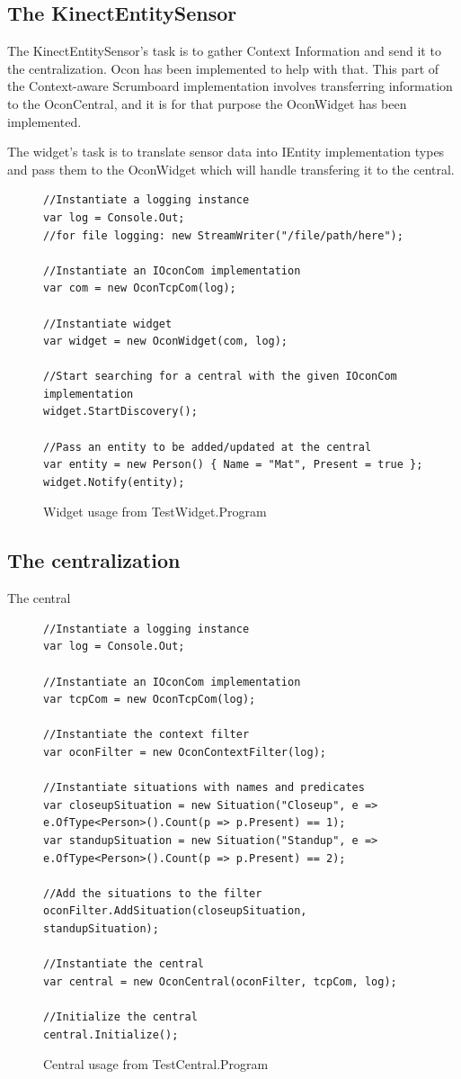 \documentclass[]{report}
\begin{document}
\subsection{The KinectEntitySensor}
The KinectEntitySensor's task is to gather Context Information and send it to the centralization. Ocon has been implemented to help with that. This part of the Context-aware Scrumboard implementation involves transferring information to the OconCentral, and it is for that purpose the OconWidget has been implemented.

The widget's task is to translate sensor data into IEntity implementation types and pass them to the OconWidget which will handle transfering it to the central.
\begin{figure}[H]
\begin{lstlisting}
//Instantiate a logging instance
var log = Console.Out;
//for file logging: new StreamWriter("/file/path/here");

//Instantiate an IOconCom implementation
var com = new OconTcpCom(log);

//Instantiate widget
var widget = new OconWidget(com, log);

//Start searching for a central with the given IOconCom implementation
widget.StartDiscovery();

//Pass an entity to be added/updated at the central
var entity = new Person() { Name = "Mat", Present = true };
widget.Notify(entity);
\end{lstlisting}
\caption{Widget usage from TestWidget.Program}
\label{code:OconWidget}
\end{figure}



\subsection{The centralization}
The central
\begin{figure}[H]
\begin{lstlisting}
//Instantiate a logging instance
var log = Console.Out;

//Instantiate an IOconCom implementation
var tcpCom = new OconTcpCom(log);

//Instantiate the context filter
var oconFilter = new OconContextFilter(log);

//Instantiate situations with names and predicates
var closeupSituation = new Situation("Closeup", e => e.OfType<Person>().Count(p => p.Present) == 1);
var standupSituation = new Situation("Standup", e => e.OfType<Person>().Count(p => p.Present) == 2);

//Add the situations to the filter
oconFilter.AddSituation(closeupSituation, standupSituation);

//Instantiate the central
var central = new OconCentral(oconFilter, tcpCom, log);

//Initialize the central
central.Initialize();
\end{lstlisting}
\caption{Central usage from TestCentral.Program}
\label{code:OconCentral}
\end{figure}
\end{document}
